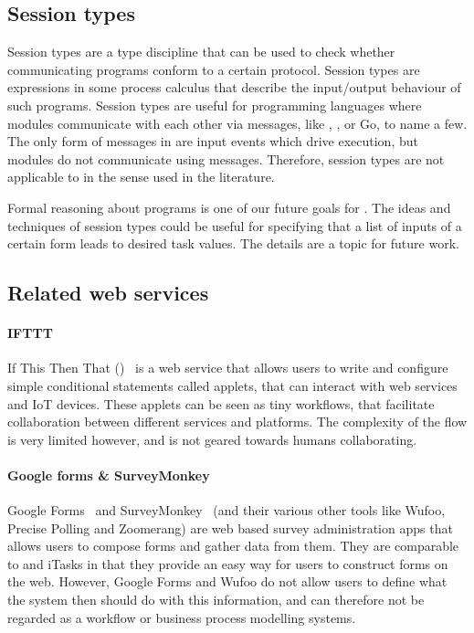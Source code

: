 \subsection{Session types}

Session types are a type discipline that can be used to check whether communicating programs conform to a certain protocol.
Session types are expressions in some process calculus that describe the input/output behaviour of such programs.
Session types are useful for programming languages where modules communicate with each other via messages, like \CSP, \PICALC, or Go, to name a few.
The only form of messages in \TOP are input events which drive execution, but modules do not communicate using messages.
Therefore, session types are not applicable to \TOP in the sense used in the literature.

Formal reasoning about \TOP programs is one of our future goals for \TOPHAT.
The ideas and techniques of session types could be useful for specifying that a list of inputs of a certain form leads to desired task values.
The details are a topic for future work.



\subsection{Related web services}


\paragraph{IFTTT}

If This Then That (\IFTTT)~\cite{IFTTT} is a web service that allows users to write and
configure simple conditional statements called applets, that can interact with
web services and IoT devices. These applets can be seen as tiny workflows, that
facilitate collaboration between different services and platforms. The
complexity of the flow is very limited however, and is not geared towards humans
collaborating.

\paragraph{Google forms \& SurveyMonkey}

Google Forms~\cite{googleforms} and SurveyMonkey~\cite{wufoo} (and their various other tools like Wufoo, Precise Polling and Zoomerang) are web based survey administration apps that allows
users to compose forms and gather data from them. They are comparable to \TOP and
iTasks in that they provide an easy way for users to construct forms on the web.
However, Google Forms and Wufoo do not allow users to define what the system
then should do with this information, and can therefore not be regarded as a
workflow or business process modelling systems.

